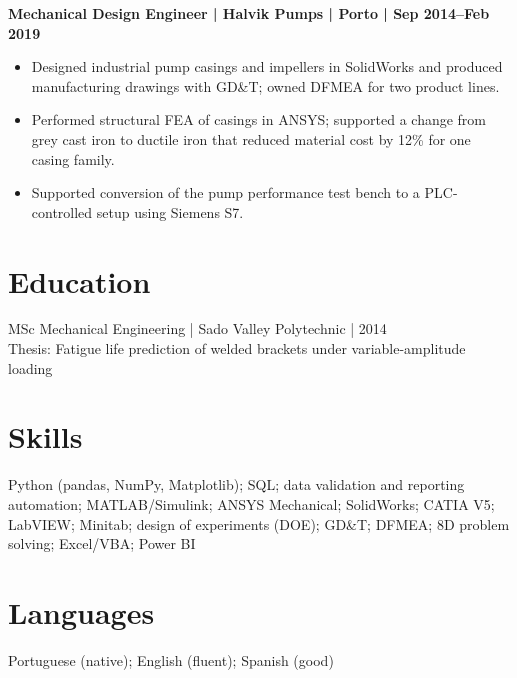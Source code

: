 \documentclass[11pt,a4paper]{article}
\begin{document}
\noindent\textbf{Mechanical Design Engineer | Halvik Pumps | Porto | Sep 2014–Feb 2019}
\begin{itemize}
    \item Designed industrial pump casings and impellers in SolidWorks and produced manufacturing drawings with GD\&T; owned DFMEA for two product lines.
    \item Performed structural FEA of casings in ANSYS; supported a change from grey cast iron to ductile iron that reduced material cost by 12\% for one casing family.
    \item Supported conversion of the pump performance test bench to a PLC-controlled setup using Siemens S7.
\end{itemize}

\section*{Education}
MSc Mechanical Engineering | Sado Valley Polytechnic | 2014\\
Thesis: Fatigue life prediction of welded brackets under variable-amplitude loading

\section*{Skills}
Python (pandas, NumPy, Matplotlib); SQL; data validation and reporting automation; MATLAB/Simulink; ANSYS Mechanical; SolidWorks; CATIA V5; LabVIEW; Minitab; design of experiments (DOE); GD\&T; DFMEA; 8D problem solving; Excel/VBA; Power BI

\section*{Languages}
Portuguese (native); English (fluent); Spanish (good)
\end{document}
